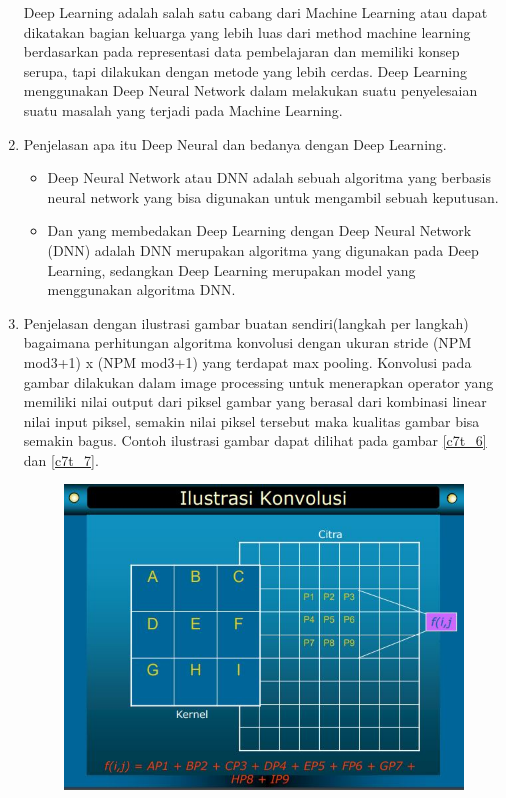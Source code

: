 \begin{enumerate}
\subitem Deep Learning adalah salah satu cabang dari Machine Learning atau dapat dikatakan bagian keluarga yang lebih luas dari method machine learning berdasarkan pada representasi data pembelajaran dan memiliki konsep serupa, tapi dilakukan dengan metode yang lebih cerdas. Deep Learning menggunakan Deep Neural Network dalam melakukan suatu penyelesaian suatu masalah yang terjadi pada Machine Learning.
\item Penjelasan apa itu Deep Neural dan bedanya dengan Deep Learning.
\begin{itemize}
\item Deep Neural Network atau DNN adalah sebuah algoritma yang berbasis neural network yang bisa digunakan untuk mengambil sebuah keputusan.
\item Dan yang membedakan Deep Learning dengan Deep Neural Network (DNN) adalah DNN merupakan algoritma yang digunakan pada Deep Learning, sedangkan Deep Learning merupakan model yang menggunakan algoritma DNN.
\end{itemize}
\item Penjelasan dengan ilustrasi gambar buatan sendiri(langkah per langkah) bagaimana perhitungan algoritma konvolusi dengan ukuran stride (NPM mod3+1) x (NPM mod3+1) yang terdapat max pooling.
\subitem Konvolusi pada gambar dilakukan dalam image processing untuk menerapkan operator yang memiliki nilai output dari piksel gambar yang berasal dari kombinasi linear nilai input piksel, semakin nilai piksel tersebut maka kualitas gambar bisa semakin bagus. Contoh ilustrasi gambar dapat dilihat pada gambar \ref{c7t_6} dan \ref{c7t_7}.
\begin{figure}[!htbp]
\centerline{\includegraphics[width=1\textwidth]{figures/c7t/6.JPG}}

\end{figure}
\end{enumerate}
